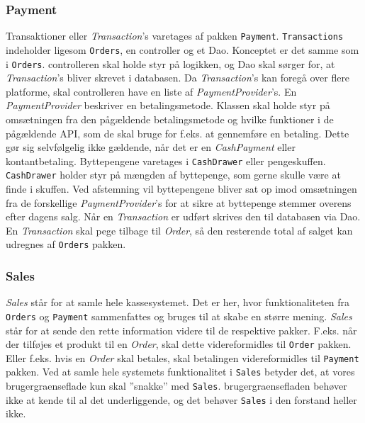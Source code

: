 \subsubsection{Payment}
Transaktioner eller \textit{Transaction}'s varetages af pakken \texttt{Payment}. \texttt{Transactions} indeholder ligesom \texttt{Orders}, en \Gls{controller} og et \Gls{Dao}. Konceptet er det samme som i \texttt{Orders}. \Gls{controller}en skal holde styr på logikken, og \Gls{Dao} skal sørger for, at \textit{Transaction}'s bliver skrevet i databasen.
\newline\newline
Da \textit{Transaction}'s kan foregå over flere platforme, skal \gls{controller}en have en liste af \textit{PaymentProvider}'s. En \textit{PaymentProvider}  beskriver en betalingsmetode. Klassen skal holde styr på omsætningen fra den pågældende betalingsmetode og hvilke funktioner i de pågældende \gls{API}, som de skal bruge for f.eks. at gennemføre en betaling. Dette gør sig selvfølgelig ikke gældende, når det er en \textit{CashPayment} eller kontantbetaling. Byttepengene varetages i \texttt{CashDrawer} eller pengeskuffen. \texttt{CashDrawer} holder styr på mængden af byttepenge, som gerne skulle være at finde i skuffen. Ved afstemning vil byttepengene bliver sat op imod omsætningen fra de forskellige \textit{PaymentProvider}'s for at sikre at byttepenge stemmer overens efter dagens salg.
\newline\newline
Når en \textit{Transaction} er udført skrives den til databasen via \gls{Dao}. En \textit{Transaction} skal pege tilbage til \textit{Order}, så den resterende total af salget kan udregnes af \texttt{Orders} pakken.

\subsubsection{Sales}
\textit{Sales} står for at samle hele kassesystemet. Det er her, hvor funktionaliteten fra \texttt{Orders} og \texttt{Payment} sammenfattes og bruges til at skabe en større mening. \textit{Sales} står for at sende den rette information videre til de respektive pakker. F.eks. når der tilføjes et produkt til en \textit{Order}, skal dette videreformidles til \texttt{Order} pakken. Eller f.eks. hvis en \textit{Order} skal betales, skal betalingen videreformidles til \texttt{Payment} pakken.
\newline\newline
Ved at samle hele systemets funktionalitet i \texttt{Sales} betyder det, at vores \gls{brugergraenseflade} kun skal ''snakke'' med \texttt{Sales}. \Gls{brugergraenseflade}n behøver ikke at kende til al det underliggende, og det behøver \texttt{Sales} i den forstand heller ikke.